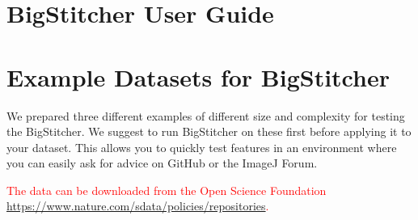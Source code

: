 \documentclass[]{spie}  %
\begin{document}


\section{BigStitcher User Guide}
\label{sec:documentation}




\section{Example Datasets for BigStitcher}
\label{sec:example}

We prepared three different examples of different size and complexity for testing the BigStitcher. We suggest to run BigStitcher on these first before applying it to your dataset. This allows you to quickly test features in an environment where you can easily ask for advice on GitHub or the ImageJ Forum.

\textcolor{red}{The data can be downloaded from the Open Science Foundation \url{https://www.nature.com/sdata/policies/repositories}.}
\end{document}
